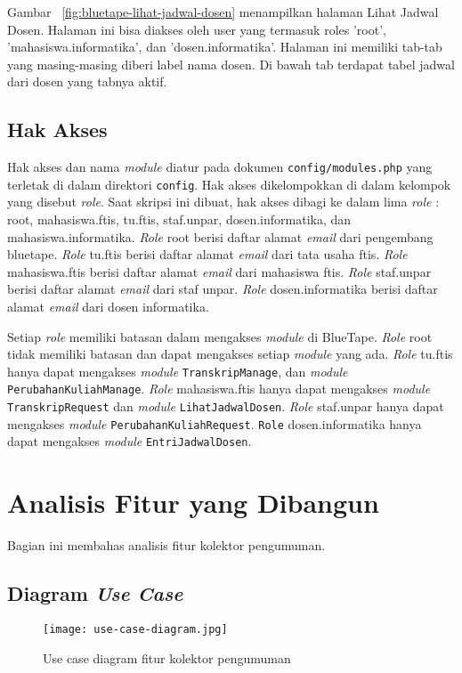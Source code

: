 	Gambar~ \ref{fig:bluetape-lihat-jadwal-dosen} menampilkan halaman Lihat Jadwal Dosen. Halaman ini bisa diakses oleh user yang termasuk roles 'root', 'mahasiswa.informatika', dan 'dosen.informatika'. Halaman ini memiliki tab-tab yang masing-masing diberi label nama dosen. Di bawah tab terdapat tabel jadwal dari dosen yang tabnya aktif.

\subsection{Hak Akses}
	Hak akses dan nama \textit{module} diatur pada dokumen \texttt{config/modules.php} yang terletak di dalam direktori \texttt{config}. Hak akses dikelompokkan di dalam kelompok yang disebut \textit{role}. Saat skripsi ini dibuat, hak akses dibagi ke dalam lima \textit{role} : root, mahasiswa.ftis, tu.ftis, staf.unpar, dosen.informatika, dan mahasiswa.informatika. \textit{Role} root berisi daftar alamat \textit{email} dari pengembang bluetape. \textit{Role} tu.ftis berisi daftar alamat \textit{email} dari tata usaha ftis. \textit{Role} mahasiswa.ftis berisi daftar alamat \textit{email} dari mahasiswa ftis. \textit{Role} staf.unpar berisi daftar alamat \textit{email} dari staf unpar. \textit{Role} dosen.informatika berisi daftar alamat \textit{email} dari dosen informatika.

	Setiap \textit{role} memiliki batasan dalam mengakses \textit{module} di BlueTape. \textit{Role} root tidak memiliki batasan dan dapat mengakses setiap \textit{module} yang ada. \textit{Role} tu.ftis hanya dapat mengakses \textit{module} \texttt{TranskripManage}, dan \textit{module} \texttt{PerubahanKuliahManage}. \textit{Role} mahasiswa.ftis hanya dapat mengakses \textit{module} \texttt{TranskripRequest} dan \textit{module} \texttt{LihatJadwalDosen}. \textit{Role} staf.unpar hanya dapat mengakses \textit{module} \texttt{PerubahanKuliahRequest}. \texttt{Role} dosen.informatika hanya dapat mengakses \textit{module} \texttt{EntriJadwalDosen}.

\section{Analisis Fitur yang Dibangun}
\label{sec:analisisYangDibangun}
	Bagian ini membahas analisis fitur kolektor pengumuman.

\subsection{Diagram \textit{Use Case}}
\begin{figure}[H]
	\centering  
	\texttt{[image: use-case-diagram.jpg]}  
	\caption[Use case diagram fitur kolektor pengumuman]{Use case diagram fitur kolektor pengumuman} 
	\label{fig:use-case-diagram} 
\end{figure}

